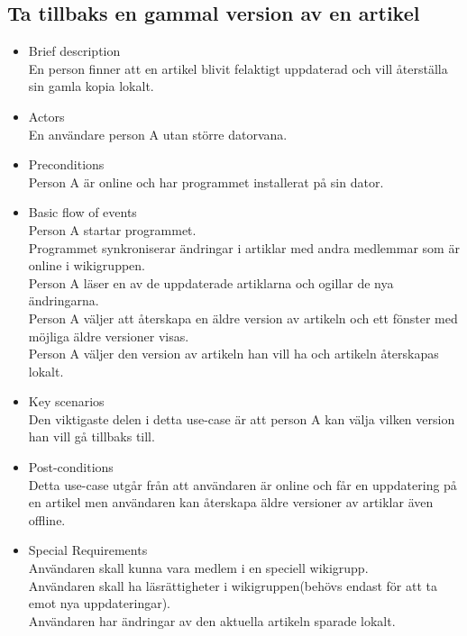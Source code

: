 \subsection{Ta tillbaks en gammal version av en artikel}
\begin{itemize}
	\item Brief description
	\\En person finner att en artikel blivit felaktigt uppdaterad och vill återställa sin gamla kopia lokalt.
	\item Actors
	\\En användare person A utan större datorvana.
	\item Preconditions
	\\Person A är online och har programmet installerat på sin dator.
	\item Basic flow of events
	\\Person A startar programmet.
	\\Programmet synkroniserar ändringar i artiklar med andra medlemmar som är online i wikigruppen.
	\\Person A läser en av de uppdaterade artiklarna och ogillar de nya ändringarna.
	\\Person A väljer att återskapa en äldre version av artikeln och ett fönster med möjliga äldre versioner visas.
	\\Person A väljer den version av artikeln han vill ha och artikeln återskapas lokalt.
	\item Key scenarios
	\\Den viktigaste delen i detta use-case är att person A kan välja vilken version han vill gå tillbaks till.
	\item Post-conditions
	\\Detta use-case utgår från att användaren är online och får en uppdatering på en artikel men användaren kan återskapa äldre versioner av artiklar även offline.
	\item Special Requirements
	\\Användaren skall kunna vara medlem i en speciell wikigrupp.
	\\Användaren skall ha läsrättigheter i wikigruppen(behövs endast för att ta emot nya uppdateringar).
	\\Användaren har ändringar av den aktuella artikeln sparade lokalt.
\end{itemize}


